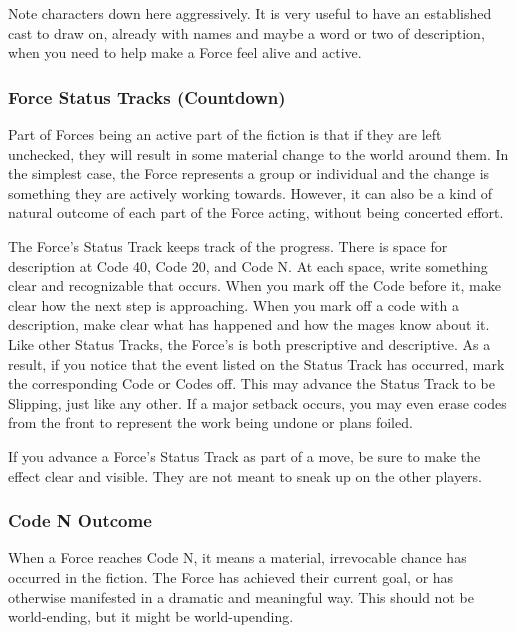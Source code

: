 \documentclass[
]{article}
\begin{document}
Note characters down here aggressively. It is very useful to have an
established cast to draw on, already with names and maybe a word or two
of description, when you need to help make a Force feel alive and
active.

\hypertarget{force-status-tracks-countdown}{%
\subsubsection{Force Status Tracks
(Countdown)}\label{force-status-tracks-countdown}}

Part of Forces being an active part of the fiction is that if they are
left unchecked, they will result in some material change to the world
around them. In the simplest case, the Force represents a group or
individual and the change is something they are actively working
towards. However, it can also be a kind of natural outcome of each part
of the Force acting, without being concerted effort.

The Force's Status Track keeps track of the progress. There is space for
description at Code 40, Code 20, and Code N. At each space, write
something clear and recognizable that occurs. When you mark off the Code
before it, make clear how the next step is approaching. When you mark
off a code with a description, make clear what has happened and how the
mages know about it. Like other Status Tracks, the Force's is both
prescriptive and descriptive. As a result, if you notice that the event
listed on the Status Track has occurred, mark the corresponding Code or
Codes off. This may advance the Status Track to be Slipping, just like
any other. If a major setback occurs, you may even erase codes from the
front to represent the work being undone or plans foiled.

If you advance a Force's Status Track as part of a move, be sure to make
the effect clear and visible. They are not meant to sneak up on the
other players.

\hypertarget{code-n-outcome}{%
\subsubsection{Code N Outcome}\label{code-n-outcome}}

When a Force reaches Code N, it means a material, irrevocable chance has
occurred in the fiction. The Force has achieved their current goal, or
has otherwise manifested in a dramatic and meaningful way. This should
not be world-ending, but it might be world-upending.
\end{document}
